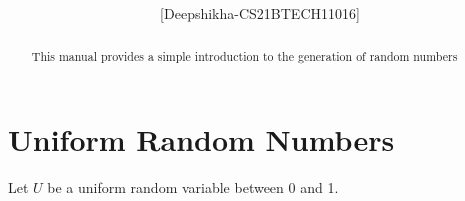 \documentclass[journal,12pt,twocolumn]{IEEEtran}
\begin{document}
\let\StandardTheFigure\thefigure
\let\StandardTheTable\thetable
\let\vec\mathbf
{}

\vspace{3cm}


\title{%
}

\author{[Deepshikha-CS21BTECH11016]}

\tableofcontents
\bigskip
\begin{abstract}
This manual provides a simple introduction to the generation of random numbers
\end{abstract}
\section{Uniform Random Numbers}
Let $U$ be a uniform random variable between 0 and 1.
\end{document}
